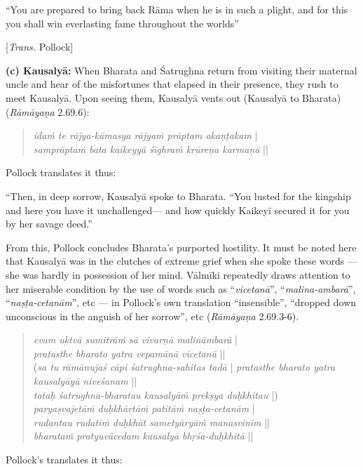 \begin{myquote}
“You are prepared to bring back Rāma when he is in such a plight, and for this you shall win everlasting fame throughout the worlds”

\hfill [{\sl Trans.} Pollock]
\end{myquote}

\noindent
\textbf{(c) Kausalyā:}  When Bharata and Śatrughna return from visiting their maternal uncle and hear of the misfortunes that elapsed in their presence, they rush to meet Kausalyā. Upon seeing them, Kausalyā vents out (Kausalyā to Bharata) ({\sl Rāmāyaṇa} 2.69.6): 
\begin{quote}
{{\sl idaṁ te rājya-kāmasya rājyaṁ prāptam akaṇṭakam}} |\\
{\sl samprāptaṁ bata kaikeyyā śīghraṁ krūreṇa karmaṇā} || 
\end{quote}

Pollock translates it thus:

\begin{myquote}
“Then, in deep sorrow, Kausalyā spoke to Bharata. “You lusted for the kingship and here you have it unchallenged--- and how quickly Kaikeyī secured it for you by her savage deed.”
\end{myquote}

From this, Pollock concludes Bharata’s purported hostility. It must be noted here that Kausalyā was in the clutches of extreme grief when she spoke these words --- she was hardly in possession of her mind. Vālmīki repeatedly draws attention to her miserable condition by the use of words such as “{\sl vicetanā}”, “{\sl malina-ambarā}”, “{\sl naṣṭa-cetanām}”, etc --- in Pollock’s own translation “insensible”, “dropped down unconscious in the anguish of her sorrow”, etc ({\sl Rāmāyaṇa} 2.69.3-6). 
\begin{quote}
{{\sl evam uktvā sumitrāṁ sā vivarṇā malināmbarā}} |\\
{\sl pratasthe bharato yatra vepamānā vicetanā} ||\\
({\sl sa tu rāmānujaś cāpi śatrughna-sahitas tadā} | 
{\sl pratasthe bharato yatra kausalyāyā niveśanam} ||\\ 
{\sl tataḥ śatrughna-bharatau kausalyāṁ prekṣya duḥkhitau} |)\\
{\sl paryaṣvajetāṁ duḥkhārtāṁ patitāṁ naṣṭa-cetanām} |\\
{\sl rudantau rudatīṁ duḥkhāt sametyāryāṁ manasvinīm} ||\\
{\sl bharataṁ pratyuvācedam kausalyā bhṛśa-duḥkhitā} || 
\end{quote}
Pollock’s translates it thus:

